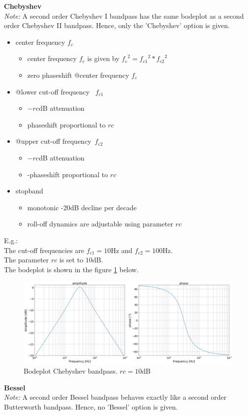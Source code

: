 \textbf{Chebyshev}\\
\emph{Note:} A second order Chebyshev I bandpass has the same bodeplot as a second order Chebyshev II bandpass. Hence, only the 'Chebyshev' option is given.\\
\begin{itemize}
    \item center frequency $f_c$
    \begin{itemize}
        \item center frequency $f_c$ is given by ${f_c}^2={f_{c1}}^2*{f_{c2}}^2$
		\item zero phaseshift @center frequency $f_c$
    \end{itemize}
    \item @lower cut-off frequency~ $f_{c1}$
    \begin{itemize}
        \item $-rc$dB attenuation
        \item phaseshift proportional to $rc$
    \end{itemize}
	\item @upper cut-off frequency~$f_{c2}$
    \begin{itemize}
        \item $-rc$dB attenuation
        \item -phaseshift proportional to $rc$
    \end{itemize}
    \item stopband 
    \begin{itemize}
        \item monotonic -20dB decline per decade
		\item roll-off dynamics are adjustable using parameter $rc$
    \end{itemize} 
\end{itemize}


E.g.: \\
The cut-off frequencies are $f_{c1}=10$Hz and $f_{c2}=100$Hz.\\
The parameter $rc$ is set to $10$dB.\\
The bodeplot is shown in the figure \ref{fig:bp_cheby1} below.
\begin{figure}[h!]
  \centering
  \includegraphics[width=.75\linewidth]{bp_cheby1.png}
  \caption{Bodeplot Chebyshev bandpass. $rc=10$dB}
  \label{fig:bp_cheby1}
\end{figure}

\textbf{Bessel}\\
\emph{Note:} A second order Bessel bandpass behaves exactly like a second order Butterworth bandpass. Hence, no 'Bessel' option is given.